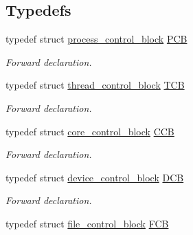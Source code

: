 \subsection*{Typedefs}
\begin{DoxyCompactItemize}
\item 
typedef struct \hyperlink{structprocess__control__block}{process\+\_\+control\+\_\+block} \hyperlink{group__rlists_ga91aaadf0c3f9cef2293a99c69795323f}{P\+CB}\hypertarget{group__rlists_ga91aaadf0c3f9cef2293a99c69795323f}{}\label{group__rlists_ga91aaadf0c3f9cef2293a99c69795323f}

\begin{DoxyCompactList}\small\item\em Forward declaration. \end{DoxyCompactList}\item 
typedef struct \hyperlink{structthread__control__block}{thread\+\_\+control\+\_\+block} \hyperlink{group__rlists_ga8e5eca0c5ec064a81ae9246c7d4f32ef}{T\+CB}\hypertarget{group__rlists_ga8e5eca0c5ec064a81ae9246c7d4f32ef}{}\label{group__rlists_ga8e5eca0c5ec064a81ae9246c7d4f32ef}

\begin{DoxyCompactList}\small\item\em Forward declaration. \end{DoxyCompactList}\item 
typedef struct \hyperlink{structcore__control__block}{core\+\_\+control\+\_\+block} \hyperlink{group__rlists_gac3d551eb0caa1296280ea2278b4f1b11}{C\+CB}\hypertarget{group__rlists_gac3d551eb0caa1296280ea2278b4f1b11}{}\label{group__rlists_gac3d551eb0caa1296280ea2278b4f1b11}

\begin{DoxyCompactList}\small\item\em Forward declaration. \end{DoxyCompactList}\item 
typedef struct \hyperlink{structdevice__control__block}{device\+\_\+control\+\_\+block} \hyperlink{group__rlists_ga5b4de7b0c72db6219c5a6dda2466181f}{D\+CB}\hypertarget{group__rlists_ga5b4de7b0c72db6219c5a6dda2466181f}{}\label{group__rlists_ga5b4de7b0c72db6219c5a6dda2466181f}

\begin{DoxyCompactList}\small\item\em Forward declaration. \end{DoxyCompactList}\item 
typedef struct \hyperlink{structfile__control__block}{file\+\_\+control\+\_\+block} \hyperlink{group__rlists_ga60c6c294fa1d8ea73ed270404fe5c17d}{F\+CB}\hypertarget{group__rlists_ga60c6c294fa1d8ea73ed270404fe5c17d}{}\label{group__rlists_ga60c6c294fa1d8ea73ed270404fe5c17d}


\end{DoxyCompactItemize}

